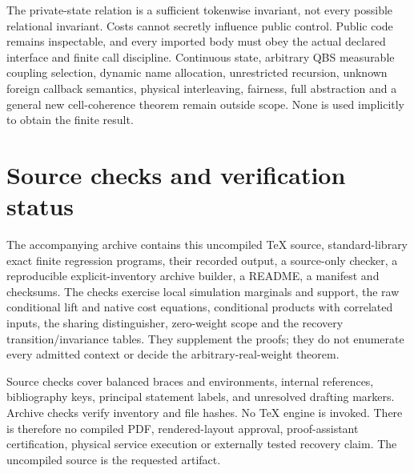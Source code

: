 \documentclass[11pt,a4paper]{article}
\theoremstyle{definition}
\begin{document}
The private-state relation is a sufficient tokenwise invariant, not every
possible relational invariant. Costs cannot secretly influence public
control. Public code remains inspectable, and every imported body must
obey the actual declared interface and finite call discipline. Continuous
state, arbitrary QBS measurable coupling selection, dynamic name
allocation, unrestricted recursion, unknown foreign callback semantics,
physical interleaving, fairness, full abstraction and a general new
cell-coherence theorem remain outside scope. None is used implicitly to
obtain the finite result.

\section{Source checks and verification status}\label{sec:checks}
The accompanying archive contains this uncompiled TeX source,
standard-library exact finite regression programs, their recorded output,
a source-only checker, a reproducible explicit-inventory archive builder,
a README, a manifest and checksums. The checks exercise local simulation
marginals and support, the raw conditional lift and native cost equations,
conditional products with correlated inputs, the sharing distinguisher,
zero-weight scope and the recovery transition/invariance tables.
They supplement the proofs; they do not enumerate every admitted context
or decide the arbitrary-real-weight theorem.

Source checks cover balanced braces and environments, internal references,
bibliography keys, principal statement labels, and unresolved drafting
markers. Archive checks verify inventory and file hashes. No TeX engine
is invoked. There is therefore no compiled PDF, rendered-layout approval,
proof-assistant certification, physical service execution or externally
tested recovery claim. The uncompiled source is the requested artifact.
\end{document}
